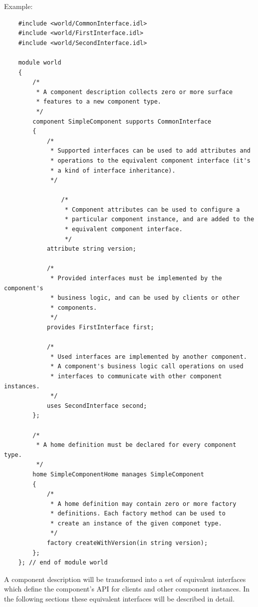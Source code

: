 \vspace{2mm}
Example:
\begin{verbatim}
    #include <world/CommonInterface.idl>
    #include <world/FirstInterface.idl>
    #include <world/SecondInterface.idl>

    module world
    {
        /*
         * A component description collects zero or more surface 
         * features to a new component type.
         */
        component SimpleComponent supports CommonInterface
        {
            /*
             * Supported interfaces can be used to add attributes and
             * operations to the equivalent component interface (it's 
             * a kind of interface inheritance).
             */
             
        	    /* 
        	     * Component attributes can be used to configure a
        	     * particular component instance, and are added to the
        	     * equivalent component interface.
        	     */
            attribute string version;
            
            /*
             * Provided interfaces must be implemented by the component's
             * business logic, and can be used by clients or other 
             * components.
             */
            provides FirstInterface first;

            /*
             * Used interfaces are implemented by another component. 
             * A component's business logic call operations on used
             * interfaces to communicate with other component instances.
             */
            uses SecondInterface second;
        };        
        
        /*
         * A home definition must be declared for every component type.
         */
        home SimpleComponentHome manages SimpleComponent
        {        
            /*
             * A home definition may contain zero or more factory
             * definitions. Each factory method can be used to
             * create an instance of the given componet type.
             */
            factory createWithVersion(in string version);
        };
    }; // end of module world
\end{verbatim}

A component description will be transformed into a set of equivalent 
interfaces which define the component's API for clients and other component instances.
In the following sections these equivalent interfaces will be described 
in detail.


